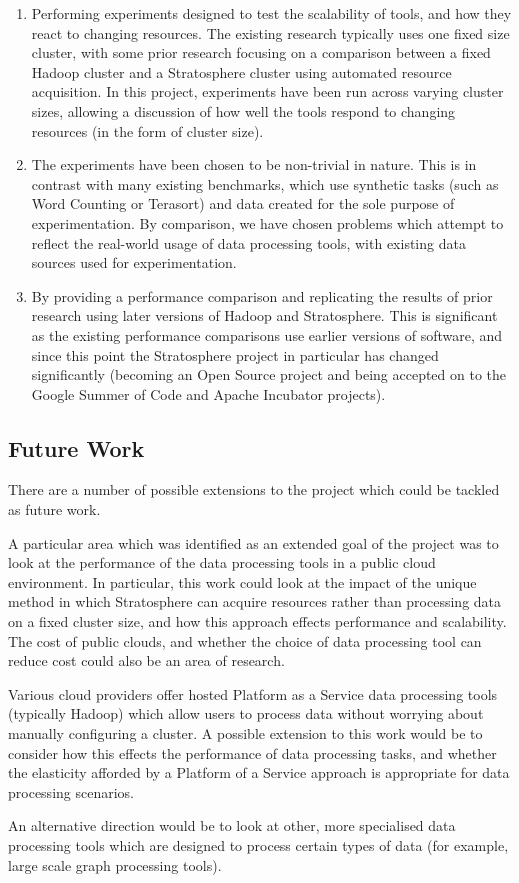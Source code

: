 \begin{enumerate}
	\item Performing experiments designed to test the scalability of tools, and how they react to changing resources. The existing research typically uses one fixed size cluster, with some prior research focusing on a comparison between a fixed Hadoop cluster and a Stratosphere cluster using automated resource acquisition. In this project, experiments have been run across varying cluster sizes, allowing a discussion of how well the tools respond to changing resources (in the form of cluster size).
	\item The experiments have been chosen to be non-trivial in nature. This is in contrast with many existing benchmarks, which use synthetic tasks (such as Word Counting or Terasort) and data created for the sole purpose of experimentation. By comparison, we have chosen problems which attempt to reflect the real-world usage of data processing tools, with existing data sources used for experimentation. 
	\item By providing a performance comparison and replicating the results of prior research using later versions of Hadoop and Stratosphere. This is significant as the existing performance comparisons use earlier versions of software, and since this point the Stratosphere project in particular has changed significantly (becoming an Open Source project and being accepted on to the Google Summer of Code and Apache Incubator projects).
\end{enumerate}

\subsection{Future Work}
There are a number of possible extensions to the project which could be tackled as future work.

A particular area which was identified as an extended goal of the project was to look at the performance of the data processing tools in a public cloud environment. In particular, this work could look at the impact of the unique method in which Stratosphere can acquire resources rather than processing data on a fixed cluster size, and how this approach effects performance and scalability. The cost of public clouds, and whether the choice of data processing tool can reduce cost could also be an area of research.

Various cloud providers offer hosted Platform as a Service data processing tools (typically Hadoop) which allow users to process data without worrying about manually configuring a cluster. A possible extension to this work would be to consider how this effects the performance of data processing tasks, and whether the elasticity afforded by a Platform of a Service approach is appropriate for data processing scenarios. 

An alternative direction would be to look at other, more specialised data processing tools which are designed to process certain types of data (for example, large scale graph processing tools). 

